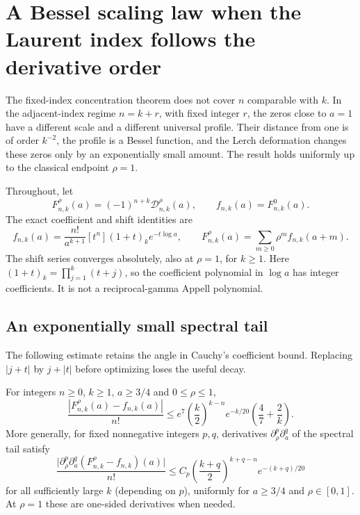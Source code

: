 
\section{A Bessel scaling law when the Laurent index follows the derivative order}
\label{bessel:sec:main}

The fixed-index concentration theorem does not cover $n$ comparable with
$k$. In the adjacent-index regime $n=k+r$, with fixed integer $r$, the
zeros close to $a=1$ have a different scale and a different universal
profile. Their distance from one is of order $k^{-2}$, the profile is a
Bessel function, and the Lerch deformation changes these zeros only by an
exponentially small amount. The result holds uniformly up to the classical
endpoint $\rho=1$.

Throughout, let
\[
 F_{n,k}^{\rho}(a)=(-1)^{n+k}\mathcal D_{n,k}^{\rho}(a),\qquad
 f_{n,k}(a)=F_{n,k}^{0}(a).
\]
The exact coefficient and shift identities are
\begin{equation}\label{bessel:eq:shift}
 f_{n,k}(a)=\frac{n!}{a^{k+1}}[t^n](1+t)_k e^{-t\log a},
 \qquad F_{n,k}^{\rho}(a)=\sum_{m\geq0}\rho^m f_{n,k}(a+m).
\end{equation}
The shift series converges absolutely, also at $\rho=1$, for $k\geq1$.
Here $(1+t)_k=\prod_{j=1}^k(t+j)$, so the coefficient polynomial in
$\log a$ has integer coefficients. It is not a reciprocal-gamma Appell
polynomial.

\subsection{An exponentially small spectral tail}

The following estimate retains the angle in Cauchy's coefficient bound.
Replacing $|j+t|$ by $j+|t|$ before optimizing loses the useful decay.

\begin{lemma}
\label{bessel:lem:tail}
For integers $n\geq0$, $k\geq1$, $a\geq3/4$ and $0\leq\rho\leq1$,
\begin{equation}\label{bessel:eq:tail}
 \frac{|F_{n,k}^{\rho}(a)-f_{n,k}(a)|}{n!}
 \leq e^7\left(\frac{k}{2}\right)^{k-n}e^{-k/20}
       \left(\frac47+\frac2k\right).
\end{equation}
More generally, for fixed nonnegative integers $p,q$, derivatives
$\partial_\rho^p\partial_a^q$ of the spectral tail satisfy
\[
 \frac{\bigl|\partial_\rho^p\partial_a^q
   (F_{n,k}^{\rho}-f_{n,k})(a)\bigr|}{n!}
 \leq C_p\left(\frac{k+q}{2}\right)^{k+q-n}e^{-(k+q)/20}
\]
for all sufficiently large $k$ (depending on $p$), uniformly for
$a\geq3/4$ and $\rho\in[0,1]$. At $\rho=1$ these are one-sided
derivatives when needed.
\end{lemma}


